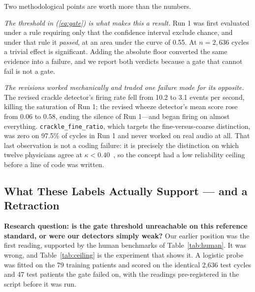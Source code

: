 \documentclass[journal,onecolumn]{IEEEtran}
\begin{document}
Two methodological points are worth more than the numbers.

\emph{The threshold in (\ref{eq:gate}) is what makes this a result.} Run 1 was
first evaluated under a rule requiring only that the confidence interval exclude
chance, and under that rule it \emph{passed}, at an area under the curve of 0.55.
At $n=2{,}636$ cycles a trivial effect is significant. Adding the absolute floor
converted the same evidence into a failure, and we report both verdicts because a
gate that cannot fail is not a gate.

\emph{The revisions worked mechanically and traded one failure mode for its
opposite.} The revised crackle detector's firing rate fell from 10.2 to 3.1 events
per second, killing the saturation of Run 1; the revised wheeze detector's mean
score rose from 0.06 to 0.58, ending the silence of Run 1---and began firing on
almost everything. \texttt{crackle\_fine\_ratio}, which targets the fine-versus-coarse
distinction, was zero on 97.5\% of cycles in Run 1 and never worked on real audio
at all. That last observation is not a coding failure: it is precisely the
distinction on which twelve physicians agree at $\kappa<0.40$~\cite{melbye2016kappa},
so the concept had a low reliability ceiling before a line of code was written.

\subsection{What These Labels Actually Support --- and a Retraction}
\label{subsec:ceiling}

\textbf{Research question: is the gate threshold unreachable on this reference
standard, or were our detectors simply weak?} Our earlier position was the first
reading, supported by the human benchmarks of Table~\ref{tab:human}. It was
wrong, and Table~\ref{tab:ceiling} is the experiment that shows it. A logistic
probe was fitted on the 79 training patients and scored on the identical 2{,}636
test cycles and 47 test patients the gate failed on, with the readings
pre-registered in the script before it was run.
\end{document}

